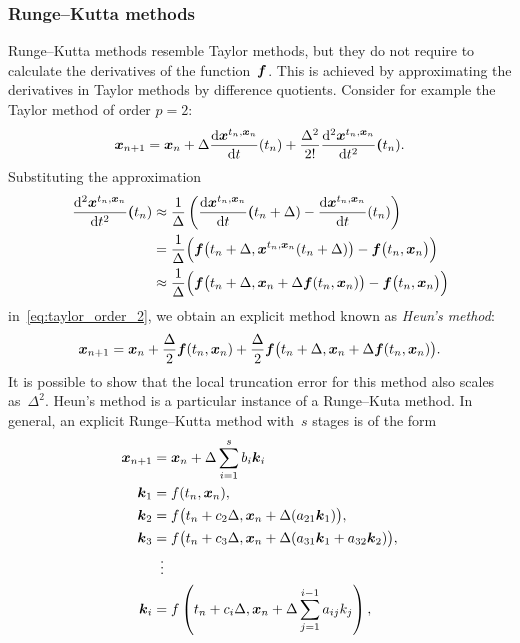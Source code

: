 \subsubsection*{Runge--Kutta methods}%
Runge--Kutta methods resemble Taylor methods,
but they do not require to calculate the derivatives of the function~$\mathbf{\boldsymbol{f}}$.
This is achieved by approximating the derivatives in Taylor methods by difference quotients.
Consider for example the Taylor method of order $p = 2$:
\begin{equation}
    \label{eq:taylor_order_2}
    \mathbf{\boldsymbol{x}}_{n+1} = \mathbf{\boldsymbol{x}}_n
    + \Delta \frac{\mathrm d \mathbf{\boldsymbol{x}}^{t_n, \mathbf{\boldsymbol{x}}_n}}{\mathrm d t} (t_n)
    + \frac{\Delta^2}{2!} \frac{\mathrm d^2 \mathbf{\boldsymbol{x}}^{t_n, \mathbf{\boldsymbol{x}}_n}}{\mathrm d t^{2}} \mathbf{\boldsymbol{(}}t_n).
\end{equation}
Substituting the approximation
\begin{align}
    \nonumber
    \frac{\mathrm d^2 \mathbf{\boldsymbol{x}}^{t_n, \mathbf{\boldsymbol{x}}_n}}{\mathrm d t^{2}} \mathbf{\boldsymbol{(}}t_n)
    &\approx \frac{1}{\Delta} \left( \frac{\mathrm d \mathbf{\boldsymbol{x}}^{t_n, \mathbf{\boldsymbol{x}}_n}}{\mathrm d t} \mathbf{\boldsymbol{(}}t_n + \Delta) - \frac{\mathrm d \mathbf{\boldsymbol{x}}^{t_n, \mathbf{\boldsymbol{x}}_n}}{\mathrm d t}(t_n) \right) \\
    \nonumber
    &= \frac{1}{\Delta} \Bigl( \mathbf{\boldsymbol{f}} \bigl( t_n + \Delta, \mathbf{\boldsymbol{x}}^{t_n, \mathbf{\boldsymbol{x}}_n}(t_n + \Delta) \bigr) - \mathbf{\boldsymbol{f}} \bigl( t_{n}, \mathbf{\boldsymbol{x}}_n \bigr) \Bigr) \\
    \label{eq:approx_heun}
    &\approx \frac{1}{\Delta} \Bigl( \mathbf{\boldsymbol{f}} \bigl( t_{n} + \Delta, \mathbf{\boldsymbol{x}}_n + \Delta \mathbf{\boldsymbol{f}}(t_n, \mathbf{\boldsymbol{x}}_n) \bigr) - \mathbf{\boldsymbol{f}} \bigl( t_{n}, \mathbf{\boldsymbol{x}}_n \bigr) \Bigr)
\end{align}
in~\eqref{eq:taylor_order_2},
we obtain an explicit method known as \emph{Heun's method}:
\[
    \mathbf{\boldsymbol{x}}_{n+1} = \mathbf{\boldsymbol{x}}_n
    + \frac{\Delta}{2}\mathbf{\boldsymbol{f}}(t_n, \mathbf{\boldsymbol{x}}_n)
    + \frac{\Delta}{2} \mathbf{\boldsymbol{f}} \bigl( t_n + \Delta, \mathbf{\boldsymbol{x}}_n + \Delta \mathbf{\boldsymbol{f}}(t_n, \mathbf{\boldsymbol{x}}_n) \bigr).
\]
It is possible to show that
the local truncation error for this method also scales as~$\Delta^2$.
Heun's method is a particular instance of a Runge--Kuta method.
In general, an explicit Runge--Kutta method with~$s$ stages is of the form
\begin{align*}
    \mathbf{\boldsymbol{x}}_{n+1} &= \mathbf{\boldsymbol{x}}_n + \Delta \sum_{i=1}^s b_i \mathbf{\boldsymbol{k}}_i \\
    \mathbf{\boldsymbol{k}}_1 &= f(t_n, \mathbf{\boldsymbol{x}}_n),  \\
    \mathbf{\boldsymbol{k}}_2 &= f\bigl(t_n + c_2 \Delta, \mathbf{\boldsymbol{x}}_n+\Delta(a_{21} \mathbf{\boldsymbol{k}}_1)\bigr), \\
    \mathbf{\boldsymbol{k}}_3 &= f\bigl(t_n + c_3 \Delta, \mathbf{\boldsymbol{x}}_n+\Delta(a_{31} \mathbf{\boldsymbol{k}}_1 + a_{32} \mathbf{\boldsymbol{k}}_2)\bigr), \\
              &\;\;\vdots \\
    \mathbf{\boldsymbol{k}}_i &= f\left(t_n + c_i \Delta, \mathbf{\boldsymbol{x}}_n + \Delta \sum_{j = 1}^{i-1} a_{ij} k_j\right),
\end{align*}
